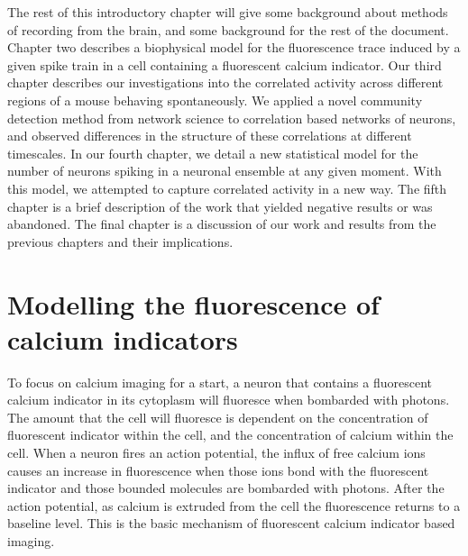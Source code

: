 The rest of this introductory chapter will give some background about methods of recording from the brain, and some background for the rest of the document. Chapter two describes a biophysical model for the fluorescence trace induced by a given spike train in a cell containing a fluorescent calcium indicator. Our third chapter describes our investigations into the correlated activity across different regions of a mouse behaving spontaneously. We applied a novel community detection method \parencite{humphries} from network science to correlation based networks of neurons, and observed differences in the structure of these correlations at different timescales. In our fourth chapter, we detail a new statistical model for the number of neurons spiking in a neuronal ensemble at any given moment. With this model, we attempted to capture correlated activity in a new way. The fifth chapter is a brief description of the work that yielded negative results or was abandoned. The final chapter is a discussion of our work and results from the previous chapters and their implications.

\section{Modelling the fluorescence of calcium indicators}

To focus on calcium imaging for a start, a neuron that contains a fluorescent calcium indicator in its cytoplasm will fluoresce when bombarded with photons. The amount that the cell will fluoresce is dependent on the concentration of fluorescent indicator within the cell, and the concentration of calcium within the cell. When a neuron fires an action potential, the influx of free calcium ions causes an increase in fluorescence when those ions bond with the fluorescent indicator and those bounded molecules are bombarded with photons. After the action potential, as calcium is extruded from the cell the fluorescence returns to a baseline level. This is the basic mechanism of fluorescent calcium indicator based imaging.

